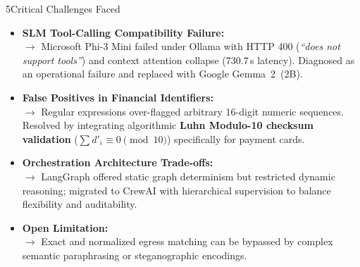 \documentclass{article}
\begin{document}
\begin{minipage}[t]{0.488\textwidth}\vspace{0pt}
\begin{posterblock}[equal height group=rowA]{5}{Critical Challenges Faced}
\begin{itemize}
  \item \textbf{SLM Tool-Calling Compatibility Failure:}\\
        $\rightarrow$ Microsoft Phi-3 Mini failed under Ollama with HTTP 400 (\textit{``does not support tools''}) and context attention collapse (730.7\,s latency). Diagnosed as an operational failure and replaced with Google Gemma~2~(2B).
  \item \textbf{False Positives in Financial Identifiers:}\\
        $\rightarrow$ Regular expressions over-flagged arbitrary 16-digit numeric sequences. Resolved by integrating algorithmic \textbf{Luhn Modulo-10 checksum validation} ($\sum d'_i \equiv 0 \pmod{10}$) specifically for payment cards.
  \item \textbf{Orchestration Architecture Trade-offs:}\\
        $\rightarrow$ LangGraph offered static graph determinism but restricted dynamic reasoning; migrated to CrewAI with hierarchical supervision to balance flexibility and auditability.
  \item \textbf{Open Limitation:}\\
        $\rightarrow$ Exact and normalized egress matching can be bypassed by complex semantic paraphrasing or steganographic encodings.
\end{itemize}
\end{posterblock}
\end{minipage}
\end{document}
